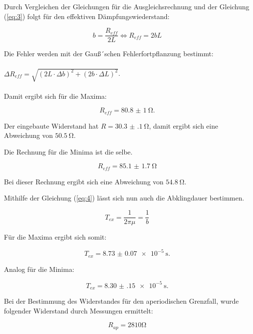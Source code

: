 Durch Vergleichen der Gleichungen für die Ausgleichsrechnung und der Gleichung (\ref{eq:3})
folgt für den effektiven Dämpfungswiederstand:

\begin{equation*}
  b = \frac{R_{eff}}{2L} \iff R_{eff} = 2bL
\end{equation*}

Die Fehler werden mit der Gauß´schen Fehlerfortpflanzung bestimmt:\\\\

$\Delta R_{eff} = \sqrt{(2L \cdot \Delta b)^2 + (2b \cdot \Delta L)^2}$.\\\\

Damit ergibt sich für die Maxima:

\begin{equation*}
  R_{eff} = \SI{80.8(10)}{\ohm}.
\end{equation*}

Der eingebaute Widerstand hat $R = \SI{30.3(1)}{\ohm}$, damit ergibt sich eine Abweichung
von $\SI{50.5}{\ohm}$.

Die Rechnung für die Minima ist die selbe.

\begin{equation*}
  R_{eff} = \SI{85.1(17)}{\ohm}
\end{equation*}

Bei dieser Rechnung ergibt sich eine Abweichung von $\SI{54.8}{\ohm}$.


Mithilfe der Gleichung (\ref{eq:4}) lässt sich nun auch die Abklingdauer bestimmen.

\begin{equation*}
  T_{ex} = \frac{1}{2\pi\mu} = \frac{1}{b}
\end{equation*}

Für die Maxima ergibt sich somit:

\begin{equation*}
  T_{ex} = \SI{8.73(7)e-5}{\second}.
\end{equation*}

Analog für die Minima:

\begin{equation*}
  T_{ex} = \SI{8.30(15)e-5}{\second}.
\end{equation*}


Bei der Bestimmung des Widerstandes für den aperiodischen Grenzfall, wurde folgender
Widerstand durch Messungen ermittelt:

\begin{equation*}
  R_{ap} = 2810 \si{\ohm}
\end{equation*}

